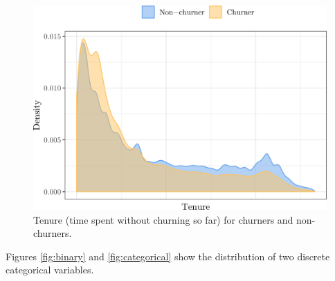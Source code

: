 \begin{figure}
    \centering
	\includegraphics[width=0.9\linewidth]{figures/tenure.png}
	\caption{Tenure (time spent without churning so far) for churners and
	non-churners.}
	\label{fig:tenure}
\end{figure}

Figures \ref{fig:binary} and \ref{fig:categorical} show the distribution of
two discrete categorical variables.

